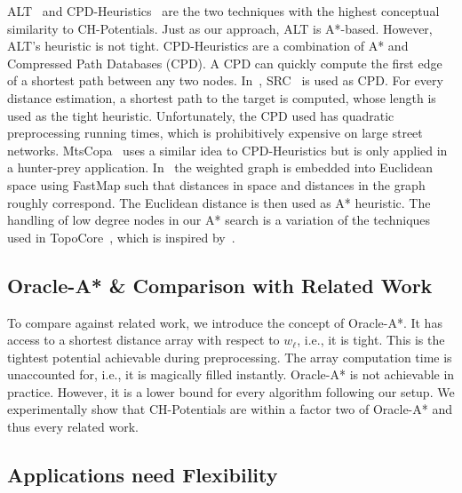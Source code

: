 \documentclass[letterpaper]{article} %
\begin{document}
ALT~\cite{gh-cspas-05} and CPD-Heuristics~\cite{DBLP:conf/ijcai/BonoGHS19} are the two techniques with the highest conceptual similarity to CH-Potentials.
Just as our approach, ALT is A*-based.
However, ALT's heuristic is not tight.
%
CPD-Heuristics are a combination of A* and Compressed Path Databases (CPD).
A CPD can quickly compute the first edge of a shortest path between any two nodes.
In~\cite{DBLP:conf/ijcai/BonoGHS19}, SRC~\cite{DBLP:conf/socs/StrasserHB14} is used as CPD.
For every distance estimation, a shortest path to the target is computed, whose length is used as the tight heuristic.
Unfortunately, the CPD used has quadratic preprocessing running times, which is prohibitively expensive on large street networks.
%
MtsCopa~\cite{DBLP:journals/tciaig/BaierBHH15} uses a similar idea to CPD-Heuristics but is only applied in a hunter-prey application.
%
In~\cite{DBLP:conf/ijcai/0002UJAKK18} the weighted graph is embedded into Euclidean space using FastMap such that distances in space and distances in the graph roughly correspond.
The Euclidean distance is then used as A* heuristic.
%
The handling of low degree nodes in our A* search is a variation of the techniques used in TopoCore~\cite{DBLP:conf/gis/DibbeltSW15}, which is inspired by~\cite{DBLP:journals/pvldb/FunkeNS14}.

\subsection{Oracle-A* \& Comparison with Related Work}

To compare against related work, we introduce the concept of Oracle-A*.
It has access to a shortest distance array with respect to $w_\ell$, i.e., it is tight.
This is the tightest potential achievable during preprocessing.
The array computation time is unaccounted for, i.e., it is magically filled instantly.
Oracle-A* is not achievable in practice.
However, it is a lower bound for every algorithm following our setup.
We experimentally show that CH-Potentials are within a factor two of Oracle-A* and thus every related work.

\subsection{Applications need Flexibility}
\end{document}
